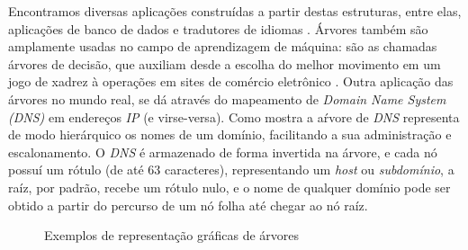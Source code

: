 Encontramos diversas aplicações construídas a partir destas estruturas, entre elas, aplicações de banco de dados e tradutores de idiomas \citep{book-algoritmos-teoria-pratica}. Árvores também são amplamente usadas no campo de aprendizagem de máquina: são as chamadas árvores de decisão, que auxiliam desde a escolha do melhor movimento em um jogo de xadrez  à operações em sites de comércio eletrônico \citep{book-inteligencia-artificial}. 
Outra aplicação das árvores no mundo real, se dá através do mapeamento de \textit{Domain Name System (DNS)} em endereços \textit{IP} (e virse-versa). Como mostra  \citep{arvore-dns}  a aŕvore de \textit{DNS} representa de modo hierárquico os nomes de um domínio, facilitando a sua administração e escalonamento. O \textit{DNS} é armazenado de forma invertida na árvore, e cada nó possuí um rótulo (de até $63$ caracteres), representando um \textit{host} ou \textit{subdomínio}, a raíz, por padrão, recebe um rótulo nulo, e o nome de qualquer domínio pode ser obtido a partir do percurso de um nó folha até chegar ao nó raíz.
\begin{figure}[h!]
    \centering
      \caption[Exemplos de representação gráficas de árvores]{Exemplos de representação gráficas de árvores}
      \qquad
      \label{fig:example-tree}
\end{figure}
